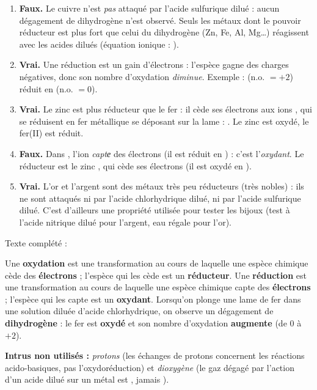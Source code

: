 \documentclass[11pt]{article}
\begin{document}
\begin{corrige}
\begin{enumerate}
\item \textbf{Faux.} Le cuivre n'est \emph{pas} attaqué par l'acide sulfurique dilué : aucun dégagement de dihydrogène n'est observé. Seuls les métaux dont le pouvoir réducteur est plus fort que celui du dihydrogène (Zn, Fe, Al, Mg\dots) réagissent avec les acides dilués (équation ionique : ).
\item \textbf{Vrai.} Une réduction est un gain d'électrons : l'espèce gagne des charges négatives, donc son nombre d'oxydation \emph{diminue}. Exemple :  (n.o. $= +2$) réduit en  (n.o. $= 0$).
\item \textbf{Vrai.} Le zinc est plus réducteur que le fer : il cède ses électrons aux ions , qui se réduisent en fer métallique se déposant sur la lame : . Le zinc est oxydé, le fer(II) est réduit.
\item \textbf{Faux.} Dans , l'ion  \emph{captе} des électrons (il est réduit en ) : c'est l'\emph{oxydant}. Le réducteur est le zinc , qui cède ses électrons (il est oxydé en ).
\item \textbf{Vrai.} L'or et l'argent sont des métaux très peu réducteurs (très nobles) : ils ne sont attaqués ni par l'acide chlorhydrique dilué, ni par l'acide sulfurique dilué. C'est d'ailleurs une propriété utilisée pour tester les bijoux (test à l'acide nitrique dilué pour l'argent, eau régale pour l'or).
\end{enumerate}
\end{corrige}

\begin{corrige}
Texte complété :

Une \textbf{oxydation} est une transformation au cours de laquelle une espèce chimique cède des \textbf{électrons} ; l'espèce qui les cède est un \textbf{réducteur}. Une \textbf{réduction} est une transformation au cours de laquelle une espèce chimique capte des \textbf{électrons} ; l'espèce qui les capte est un \textbf{oxydant}. Lorsqu'on plonge une lame de fer dans une solution diluée d'acide chlorhydrique, on observe un dégagement de \textbf{dihydrogène} : le fer est \textbf{oxydé} et son nombre d'oxydation \textbf{augmente} (de $0$ à $+2$).

\textbf{Intrus non utilisés :} \emph{protons} (les échanges de protons concernent les réactions acido-basiques, pas l'oxydoréduction) et \emph{dioxygène} (le gaz dégagé par l'action d'un acide dilué sur un métal est , jamais ).
\end{corrige}
\end{document}
